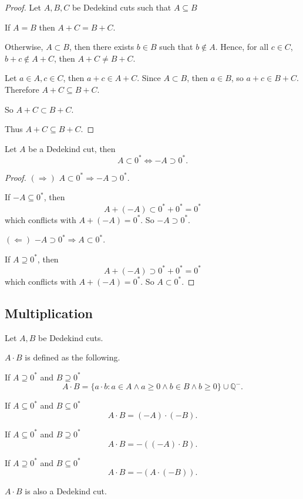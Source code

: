 \begin{proof}
    Let $A, B, C$ be Dedekind cuts such that $A\subseteq B$

    If $A = B$ then $A + C = B + C$.

    Otherwise, $A\subset B$, then there exists $b\in B$ such that $b\notin A$. Hence, for all $c\in C$, $b + c\notin A + C$, then $A + C\ne B + C$.

    Let $a\in A, c\in C$, then $a + c\in A + C$. Since $A\subset B$, then $a\in B$, so $a + c\in B + C$. Therefore $A + C\subseteq B + C$.

    So $A + C\subset B + C$.

    Thus $A + C\subseteq B + C$.
\end{proof}

\begin{theorem}\label{theorem:chapter1:negation-and-sign}
    \par Let $A$ be a Dedekind cut, then
    \[
        A\subset {0}^{*} \Longleftrightarrow -A\supset {0}^{*}.
    \]
\end{theorem}

\begin{proof}
    $(\Rightarrow)$ $A\subset {0}^{*}\Longrightarrow -A\supset {0}^{*}$.

    If $-A\subseteq {0}^{*}$, then
    \[
        A + (-A) \subset {0}^{*} + {0}^{*} = {0}^{*}
    \]
    which conflicts with $A + (-A) = {0}^{*}$. So $-A\supset {0}^{*}$.

    $(\Leftarrow)$ $-A\supset {0}^{*}\Longrightarrow A\subset {0}^{*}$.

    If $A\supseteq {0}^{*}$, then
    \[
        A + (-A) \supset {0}^{*} + {0}^{*} = {0}^{*}
    \]
    which conflicts with $A + (-A) = {0}^{*}$. So $A\subset {0}^{*}$.
\end{proof}

\subsection{Multiplication}

\begin{theorem}[Multiplication]\label{theorem:chapter1:multiplication}
    \par Let $A, B$ be Dedekind cuts.
    \par $A\cdot B$ is defined as the following.
    \par If $A\supseteq{0}^{*}$ and $B\supseteq{0}^{*}$
    \[
        A\cdot B = \{ a\cdot b : a\in A\wedge a\ge 0 \wedge b\in B\wedge b\ge 0 \} \cup \mathbb{Q}^{-}.
    \]
    \par If $A\subseteq{0}^{*}$ and $B\subseteq{0}^{*}$
    \[
        A\cdot B = (-A)\cdot (-B).
    \]
    \par If $A\subseteq{0}^{*}$ and $B\supseteq{0}^{*}$
    \[
        A\cdot B = -\left((-A)\cdot B\right).
    \]
    \par If $A\supseteq{0}^{*}$ and $B\subseteq{0}^{*}$
    \[
        A\cdot B = -\left(A\cdot (-B)\right).
    \]
    \par $A\cdot B$ is also a Dedekind cut.
\end{theorem}

